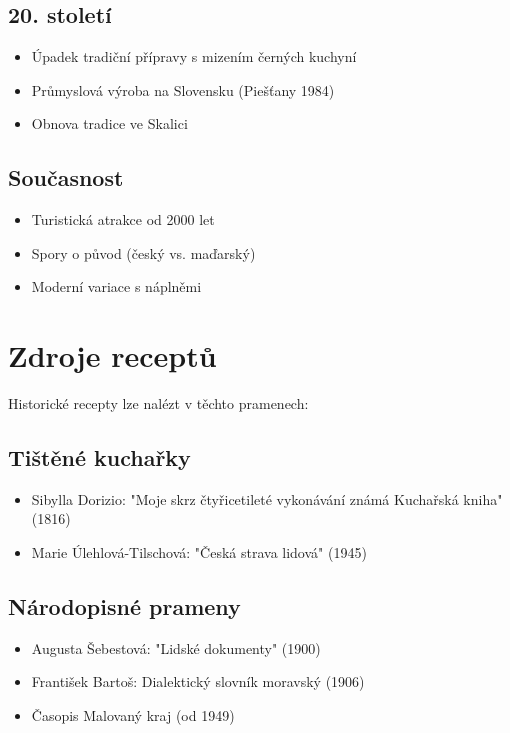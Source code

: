\documentclass[a5paper,10pt]{book}
\begin{document}
\section{20. století}
\begin{itemize}
\item Úpadek tradiční přípravy s mizením černých kuchyní
\item Průmyslová výroba na Slovensku (Piešťany 1984)
\item Obnova tradice ve Skalici
\end{itemize}

\section{Současnost}
\begin{itemize}
\item Turistická atrakce od 2000 let
\item Spory o původ (český vs. maďarský)
\item Moderní variace s náplněmi
\end{itemize}

\chapter{Zdroje receptů}
Historické recepty lze nalézt v těchto pramenech:

\section{Tištěné kuchařky}
\begin{itemize}
\item Sibylla Dorizio: "Moje skrz čtyřicetileté vykonávání známá Kuchařská kniha" (1816)
\item Marie Úlehlová-Tilschová: "Česká strava lidová" (1945)
\end{itemize}

\section{Národopisné prameny}
\begin{itemize}
\item Augusta Šebestová: "Lidské dokumenty" (1900)
\item František Bartoš: Dialektický slovník moravský (1906)
\item Časopis Malovaný kraj (od 1949)
\end{itemize}
\end{document}
